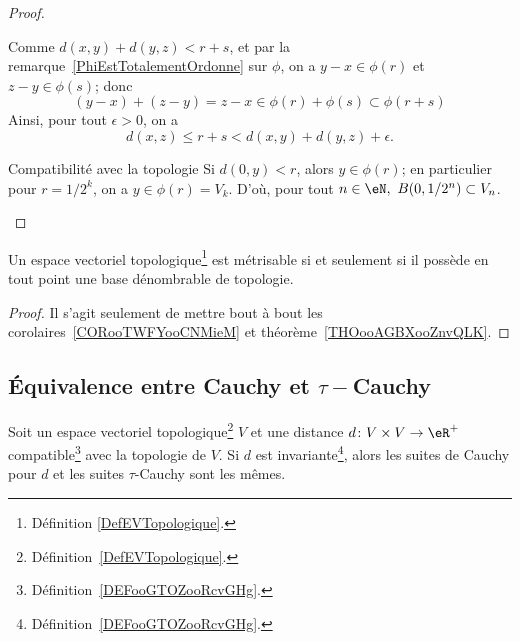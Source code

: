 \begin{proof}
\begin{subproof}
\begin{equation}
  \end{equation}
  Comme \(d(x,y) + d(y,z) <  r + s\), et par la remarque~\ref{PhiEstTotalementOrdonne} sur \(\phi\), on a \(y - x \in \phi(r)\) et \(z - y \in \phi(s)\); donc
  \begin{equation}
    (y - x) + (z - y) = z - x \in \phi(r) + \phi(s) \subset \phi(r+s)
  \end{equation}
  Ainsi, pour tout \(\epsilon > 0 \), on a
  \begin{equation}
    d(x,z) \leq r+s < d(x,y) + d(y,z) + \epsilon.
  \end{equation}

\item[Compatibilité avec la topologie] Si \(d(0,y) < r \), alors \( y  \in \phi(r) \); en particulier pour \( r = 1/2^k \), on a \(y \in \phi(r) = V_k\). D'où, pour tout \( n \in \eN,\ B(0, 1/2^n) \subset V_n \).
\end{subproof}
\end{proof}

\begin{proposition}     \label{PROPooPRLBooGtsRjr}
    Un espace vectoriel topologique\footnote{Définition \ref{DefEVTopologique}.} est métrisable si et seulement si il possède en tout point une base dénombrable de topologie.
\end{proposition}

\begin{proof}
    Il s'agit seulement de mettre bout à bout les corolaires~\ref{CORooTWFYooCNMieM} et théorème~\ref{THOooAGBXooZnvQLK}.
\end{proof}

\subsection{Équivalence entre Cauchy et \texorpdfstring{$\tau-$}{tau-}Cauchy}

\begin{lemma}       \label{LEMooIAHSooFkXjvr}
    Soit un espace vectoriel topologique\footnote{Définition~\ref{DefEVTopologique}.} \( V\) et une distance \( d\colon V\times V\to \eR^+\) compatible\footnote{Définition~\ref{DEFooGTOZooRcvGHg}.} avec la topologie de \( V\). Si \( d\) est invariante\footnote{Définition~\ref{DEFooGTOZooRcvGHg}.}, alors les suites de Cauchy pour \( d \) et les suites \( \tau\)-Cauchy sont les mêmes.
\end{lemma}

